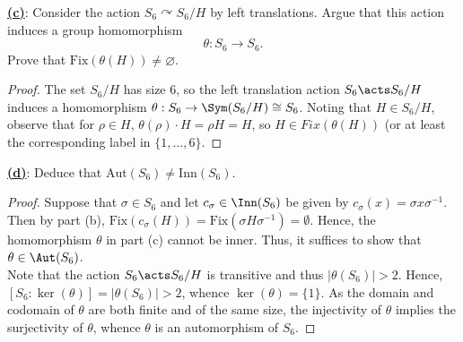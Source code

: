 \documentclass[12pt]{article}
\begin{document}
\begin{homeworkProblem}
  \underline{\textbf{(c)}}: Consider the action $S_6 \curvearrowright S_6 / H$ by left translations. Argue that this action induces a group homomorphism
  \[
    \theta : S_6 \to S_6.
  \]
  Prove that $\mathrm{Fix}(\theta(H)) \neq \varnothing$.

  \begin{proof}
    The set $ S_{6}/H $ has size $ 6 $, so the left translation action $ S_{6}\acts S_{6}/H $ induces a homomorphism $ \theta: S_{6}\to \Sym(S_{6}/H)\cong S_{6} $. Noting that $ H\in S_{6}/H $, observe that for $ \rho\in H $, $ \theta(\rho)\cdot H = \rho H = H $, so $ H\in Fix(\theta(H)) $ (or at least the corresponding label in $ \{1,\ldots,6\} $.
  \end{proof}

  \underline{\textbf{(d)}}: Deduce that $\mathrm{Aut}(S_6) \neq \mathrm{Inn}(S_6)$.

  \begin{proof}
    Suppose that $ \sigma\in S_{6} $ and let $ c_{\sigma}\in \Inn(S_{6}) $ be given by $ c_{\sigma}(x) = \sigma x \sigma^{-1} $. Then by part (b), $ \mathrm{Fix}(c_{\sigma}(H)) = \mathrm{Fix}(\sigma H \sigma^{-1}) = \emptyset $. Hence, the homomorphism $ \theta $ in part (c) cannot be inner. Thus, it suffices to show that $ \theta\in \Aut(S_{6}) $.\\

    Note that the action $ S_{6}\acts S_{6}/H $ is transitive and thus $ |\theta(S_{6})| >2 $. Hence, $ [S_{6}:\ker(\theta)] = |\theta(S_{6})|>2 $, whence $ \ker(\theta) = \{1\} $. As the domain and codomain of $ \theta $ are both finite and of the same size, the injectivity of $ \theta $  implies the surjectivity of $ \theta $, whence $ \theta $ is an automorphism of $ S_{6} $.

  \end{proof}

\end{homeworkProblem}
\end{document}
